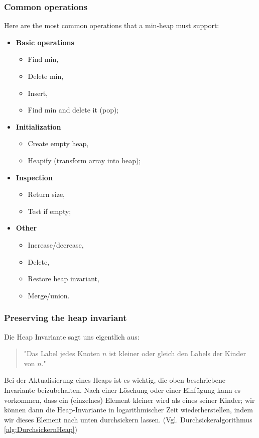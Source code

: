 \documentclass[a4paper]{article}
\begin{document}
\newpage
\subsubsection*{Common operations} \label{common operations}
Here are the most common operations that a min-heap must support:
\begin{itemize}
\item \textbf{Basic operations}
  \begin{itemize}
  \item Find min,
  \item Delete min,
  \item Insert,
  \item Find min and delete it (pop);
  \end{itemize}
\item \textbf{Initialization}
  \begin{itemize}
  \item Create empty heap,
  \item Heapify (transform array into heap);
  \end{itemize}
\item\textbf{Inspection}
  \begin{itemize}
  \item Return size,
  \item Test if empty;
  \end{itemize}
\item \textbf{Other}
  \begin{itemize}
  \item Increase/decrease,
  \item Delete,
  \item Restore heap invariant,
  \item Merge/union.
  \end{itemize}
\end{itemize}


\subsubsection*{Preserving the heap invariant}
Die Heap Invariante sagt uns eigentlich aus: 
\begin{quote}
    "Das Label jedes Knoten $n$ ist kleiner oder gleich den Labels der Kinder von $n$."
\end{quote}
Bei der Aktualisierung eines Heaps ist es wichtig, die oben beschriebene Invariante beizubehalten. Nach einer Löschung oder einer Einfügung kann es vorkommen, dass ein (einzelnes) Element kleiner wird als eines seiner Kinder; wir können dann die Heap-Invariante in logarithmischer Zeit wiederherstellen, indem wir dieses Element nach unten durchsickern lassen. (Vgl. Durchsickeralgorithmus \ref{alg:DurchsickernHeap})
\end{document}
